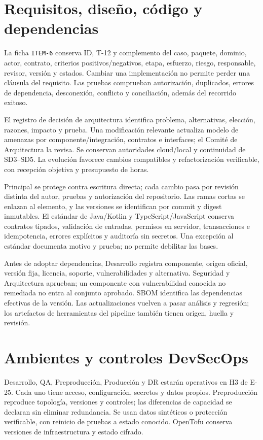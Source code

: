 \section{Requisitos, diseño, código y dependencias}
La ficha \texttt{ITEM-6} conserva ID, T-12 y complemento del caso, paquete, dominio, actor, contrato, criterios positivos/negativos, etapa, esfuerzo, riesgo, responsable, revisor, versión y estados. Cambiar una implementación no permite perder una cláusula del requisito. Las pruebas comprueban autorización, duplicados, errores de dependencia, desconexión, conflicto y conciliación, además del recorrido exitoso.

El registro de decisión de arquitectura identifica problema, alternativas, elección, razones, impacto y prueba. Una modificación relevante actualiza modelo de amenazas por componente/integración, contratos e interfaces; el Comité de Arquitectura la revisa. Se conservan autoridades cloud/local y continuidad de SD3--SD5. La evolución favorece cambios compatibles y refactorización verificable, con recepción objetiva y presupuesto de horas. \parencites[RT-11.02, p.~23]{sd6-bt}[PW.1/PW.2, tabla~1]{sd6-ssdf}

Principal se protege contra escritura directa; cada cambio pasa por revisión distinta del autor, pruebas y autorización del repositorio. Las ramas cortas se enlazan al elemento, y las versiones se identifican por commit y digest inmutables. El estándar de Java/Kotlin y TypeScript/JavaScript conserva contratos tipados, validación de entradas, permisos en servidor, transacciones e idempotencia, errores explícitos y auditoría sin secretos. Una excepción al estándar documenta motivo y prueba; no permite debilitar las bases. \parencites[RT-04.03/04, p.~10]{sd6-bt}[PS.1; PW.5/PW.7, tabla~1]{sd6-ssdf}

Antes de adoptar dependencias, Desarrollo registra componente, origen oficial, versión fija, licencia, soporte, vulnerabilidades y alternativa. Seguridad y Arquitectura aprueban; un componente con vulnerabilidad conocida no remediada no entra al conjunto aprobado. SBOM identifica las dependencias efectivas de la versión. Las actualizaciones vuelven a pasar análisis y regresión; los artefactos de herramientas del pipeline también tienen origen, huella y revisión. \parencites[RT-11.23/26, p.~24]{sd6-bt}[PW.4, tabla~1]{sd6-ssdf}

\section{Ambientes y controles DevSecOps}
Desarrollo, QA, Preproducción, Producción y DR estarán operativos en H3 de E-25. Cada uno tiene acceso, configuración, secretos y datos propios. Preproducción reproduce topología, versiones y controles; las diferencias de capacidad se declaran sin eliminar redundancia. Se usan datos sintéticos o protección verificable, con reinicio de pruebas a estado conocido. OpenTofu conserva versiones de infraestructura y estado cifrado. \parencites[RT-04.01/02, p.~10; RT-11.25, p.~24]{sd6-bt}[PO.5, tabla~1]{sd6-ssdf}

